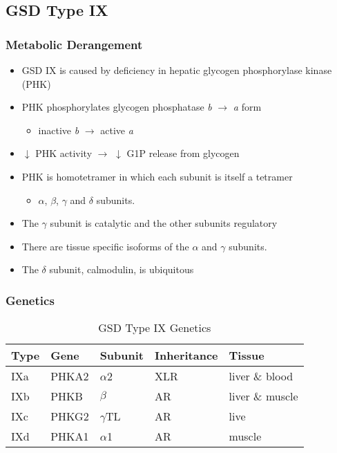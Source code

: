 \documentclass{scrartcl}
\begin{document}
\subsection{GSD Type IX}
\label{sec:org57ab4e3}
\subsubsection{Metabolic Derangement}
\label{sec:orgeb8d90f}
\begin{itemize}
\item GSD IX is caused by deficiency in hepatic glycogen phosphorylase kinase (PHK)
\item PHK phosphorylates glycogen phosphatase \emph{b} \(\to\) \emph{a} form
\begin{itemize}
\item inactive \emph{b} \(\to\)  active \emph{a}
\end{itemize}
\item \(\downarrow\) PHK activity \(\to\) \(\downarrow\) G1P release from glycogen
\item PHK is homotetramer in which each subunit is itself a tetramer
\begin{itemize}
\item \(\alpha\), \(\beta\), \(\gamma\) and \(\delta\) subunits.
\end{itemize}
\item The \(\gamma\) subunit is catalytic and the other subunits regulatory
\item There are tissue specific isoforms of the \(\alpha\) and \(\gamma\) subunits.
\item The \(\delta\) subunit, calmodulin, is ubiquitous
\end{itemize}

\subsubsection{Genetics}
\label{sec:orgb5274c1}
\begin{table}[htbp]
\caption{\label{tab:org1d5806a}
GSD Type IX Genetics}
\centering
\begin{tabular}{lllll}
Type & Gene & Subunit & Inheritance & Tissue\\
\hline
IXa & PHKA2 & \(\alpha\)2 & XLR & liver \& blood\\
IXb & PHKB & \(\beta\) & AR & liver \& muscle\\
IXc & PHKG2 & \(\gamma\)TL & AR & live\\
IXd & PHKA1 & \(\alpha\)1 & AR & muscle\\
\end{tabular}
\end{table}
\end{document}

